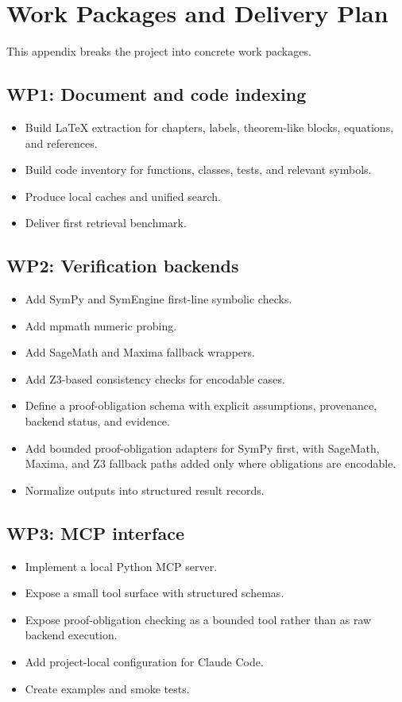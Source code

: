 \chapter{Work Packages and Delivery Plan}

This appendix breaks the project into concrete work packages.

\section*{WP1: Document and code indexing}
\begin{itemize}
  \item Build LaTeX extraction for chapters, labels, theorem-like blocks, equations, and references.
  \item Build code inventory for functions, classes, tests, and relevant symbols.
  \item Produce local caches and unified search.
  \item Deliver first retrieval benchmark.
\end{itemize}

\section*{WP2: Verification backends}
\begin{itemize}
  \item Add SymPy and SymEngine first-line symbolic checks.
  \item Add mpmath numeric probing.
  \item Add SageMath and Maxima fallback wrappers.
  \item Add Z3-based consistency checks for encodable cases.
  \item Define a proof-obligation schema with explicit assumptions, provenance, backend status, and evidence.
  \item Add bounded proof-obligation adapters for SymPy first, with SageMath, Maxima, and Z3 fallback paths added only where obligations are encodable.
  \item Normalize outputs into structured result records.
\end{itemize}

\section*{WP3: MCP interface}
\begin{itemize}
  \item Implement a local Python MCP server.
  \item Expose a small tool surface with structured schemas.
  \item Expose proof-obligation checking as a bounded tool rather than as raw backend execution.
  \item Add project-local configuration for Claude Code.
  \item Create examples and smoke tests.
\end{itemize}

